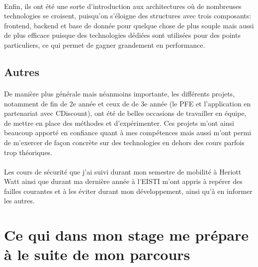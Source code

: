 \paragraph{}
Enfin, ils ont été une sorte d'introduction aux architectures où de nombreuses technologies se croisent, puisqu'on s'éloigne des structures avec trois composants: frontend, backend et base de donnée pour quelque chose de plus souple mais aussi de plus efficace puisque des technologies dédiées sont utilisées pour des points particuliers, ce qui permet de gagner grandement en performance.

\subsection{Autres}
\label{sub:Autres}
\paragraph{}
De manière plus générale mais néanmoins importante, les différents projets, notamment de fin de 2e année et ceux de de 3e année (le PFE et l'application en partenariat avec CDiscount), ont été de belles occasions de travailler en équipe, de mettre en place des méthodes et d'expérimenter.
Ces projets m'ont ainsi beaucoup apporté en confiance quant à mes compétences mais aussi m'ont permi de m'exercer de façon concrète sur des technologies en dehors des cours parfois trop théoriques.
\paragraph{}
Les cours de sécurité que j'ai suivi durant mon semestre de mobilité à Heriott Watt ainsi que durant ma dernière année à l'EISTI m'ont appris à repérer des failles courantes et à les éviter durant mon développement, ainsi qu'à en informer les autres.

\section{Ce qui dans mon stage me prépare à le suite de mon parcours}
